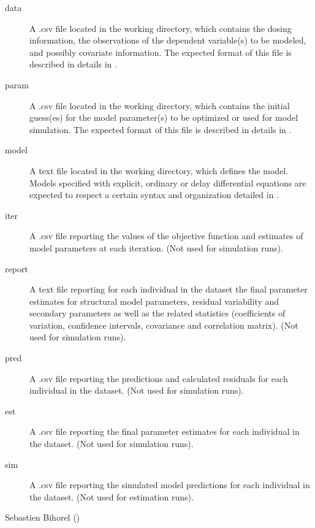 \begin{Arguments}
\begin{ldescription}
\begin{description}
\item[data] A .csv file located in the working directory, which contains
the dosing information, the observations of the dependent variable(s)
to be modeled, and possibly covariate information. The expected format 
of this file is described in details in .
\item[param] A .csv file located in the working directory, which contains
the initial guess(es) for the model parameter(s) to be optimized or used
for model simulation. The expected format of this file is described in
details in .
\item[model] A text file located in the working directory, which defines 
the model. Models specified with explicit, ordinary or delay 
differential equations are expected to respect a certain syntax and 
organization detailed in .
\item[iter] A .csv file reporting the values of the objective function
and estimates of model parameters at each iteration.  (Not used for 
simulation runs).
\item[report] A text file reporting for each individual in the dataset the
final parameter estimates for structural model parameters, residual 
variability and secondary parameters as well as the related statistics 
(coefficients of variation, confidence intervals, covariance and 
correlation matrix). (Not used for simulation runs).
\item[pred] A .csv file reporting the predictions and calculated residuals
for each individual in the dataset. (Not used for simulation runs).
\item[est] A .csv file reporting the final parameter estimates for each
individual in the dataset. (Not used for simulation runs).
\item[sim] A .csv file reporting the simulated model predictions for each 
individual in the dataset. (Not used for estimation runs).

\end{description}


\end{ldescription}
\end{Arguments}
%
\begin{Author}\relax
Sebastien Bihorel ()
\end{Author}
%
\begin{SeeAlso}\relax
{}
\end{SeeAlso}
